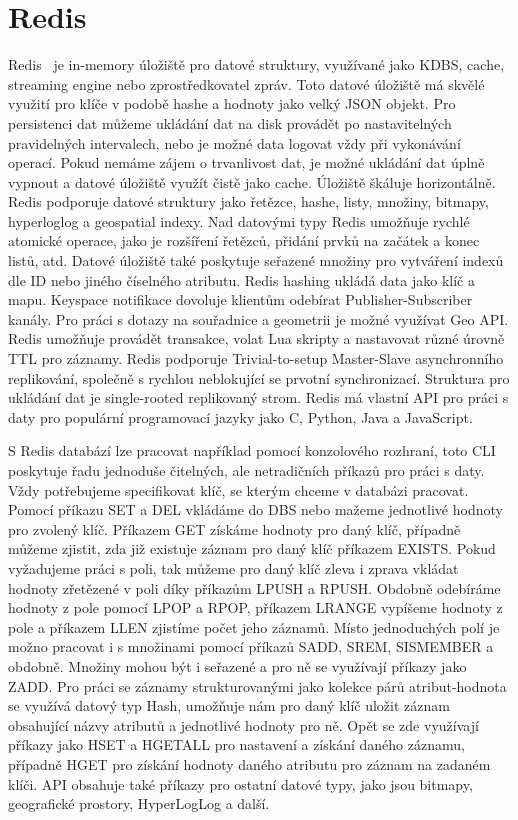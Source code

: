 \documentclass[czech,master,dept460,male,csharp,cpdeclaration]{diploma}
\begin{document}
	\section{Redis} \label{lab-redis}
	
	Redis~\cite{redis} je in-memory úložiště pro datové struktury, využívané jako KDBS, cache, streaming engine nebo zprostředkovatel zpráv. Toto datové úložiště má skvělé využití pro klíče v podobě hashe a hodnoty jako velký JSON objekt. Pro persistenci dat můžeme ukládání dat na disk provádět po nastavitelných pravidelných intervalech, nebo je možné data logovat vždy při vykonávání operací. Pokud nemáme zájem o trvanlivost dat, je možné ukládání dat úplně vypnout a datové úložiště využít čistě jako cache. Úložiště škáluje horizontálně. Redis podporuje datové struktury jako řetězce, hashe, listy, množiny, bitmapy, hyperloglog a geospatial indexy. Nad datovými typy Redis umožňuje rychlé atomické operace, jako je rozšíření řetězců, přidání prvků na začátek a konec listů, atd. Datové úložiště také poskytuje seřazené množiny pro vytváření indexů dle ID nebo jiného číselného atributu. Redis hashing ukládá data jako klíč a mapu. Keyspace notifikace dovoluje klientům odebírat Publisher-Subscriber kanály. Pro práci s dotazy na souřadnice a geometrii je možné využívat Geo API. Redis umožňuje provádět transakce, volat Lua skripty a nastavovat různé úrovně TTL pro záznamy. Redis podporuje Trivial-to-setup Master-Slave asynchronního replikování, společně s rychlou neblokující se prvotní synchronizací. Struktura pro ukládání dat je single-rooted replikovaný strom. Redis má vlastní API pro práci s daty pro populární programovací jazyky jako C, Python, Java a JavaScript.
	
	S Redis databází lze pracovat například pomocí konzolového rozhraní, toto CLI~\cite{rediscli} poskytuje řadu jednoduše čitelných, ale netradičních příkazů pro práci s daty. Vždy potřebujeme specifikovat klíč, se kterým chceme v databázi pracovat. Pomocí příkazu SET a DEL vkládáme do DBS nebo mažeme jednotlivé hodnoty pro zvolený klíč. Příkazem GET získáme hodnoty pro daný klíč, případně můžeme zjistit, zda již existuje záznam pro daný klíč příkazem EXISTS. Pokud vyžadujeme práci s poli, tak můžeme pro daný klíč zleva i zprava vkládat hodnoty zřetězené v poli díky příkazům LPUSH a RPUSH. Obdobně odebíráme hodnoty z pole pomocí LPOP a RPOP, příkazem LRANGE vypíšeme hodnoty z pole a příkazem LLEN zjistíme počet jeho záznamů. Místo jednoduchých polí je možno pracovat i s množinami pomocí příkazů SADD, SREM, SISMEMBER a obdobně. Množiny mohou být i seřazené a pro ně se využívají příkazy jako ZADD. Pro práci se záznamy strukturovanými jako kolekce párů atribut-hodnota se využívá datový typ Hash, umožňuje nám pro daný klíč uložit záznam obsahující názvy atributů a jednotlivé hodnoty pro ně. Opět se zde využívají příkazy jako HSET a HGETALL pro nastavení a získání daného záznamu, případně HGET pro získání hodnoty daného atributu pro záznam na zadaném klíči. API obsahuje také příkazy pro ostatní datové typy, jako jsou bitmapy, geografické prostory, HyperLogLog a další.
	
\end{document}
